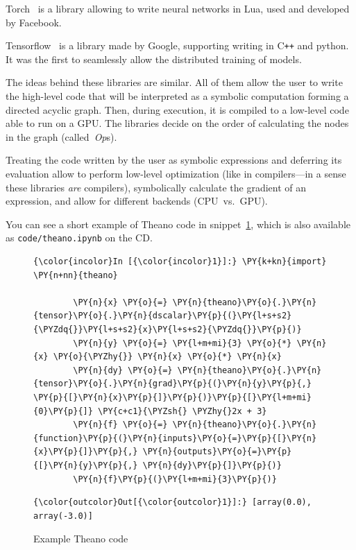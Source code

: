 Torch~\cite{torch} is a library allowing to write neural networks in Lua, used and developed by Facebook.

Tensorflow~\cite{tensorflow} is a library made by Google, supporting writing in C\texttt{++} and python. It was the first to seamlessly allow the distributed training of models.

The ideas behind these libraries are similar. All of them allow the user to write the high-level code that will be interpreted as a symbolic computation forming a directed acyclic graph. Then, during execution, it is compiled to a low-level code able to run on a GPU. The libraries decide on the order of calculating the nodes in the graph (called~\emph{Op}s).

Treating the code written by the user as symbolic expressions and deferring its evaluation allow to perform low-level optimization (like in compilers---in a sense these libraries \textit{are} compilers), symbolically calculate the gradient of an expression, and allow for different backends (CPU~vs.~GPU).

\renewcommand{\figurename}{Snippet}
You can see a short example of Theano code in snippet~\ref{theano-code}, which is also available as \texttt{code/theano.ipynb} on the CD.

\begin{figure}[!h]
\begin{Verbatim}[commandchars=\\\{\}]
{\color{incolor}In [{\color{incolor}1}]:} \PY{k+kn}{import} \PY{n+nn}{theano}
        
        \PY{n}{x} \PY{o}{=} \PY{n}{theano}\PY{o}{.}\PY{n}{tensor}\PY{o}{.}\PY{n}{dscalar}\PY{p}{(}\PY{l+s+s2}{\PYZdq{}}\PY{l+s+s2}{x}\PY{l+s+s2}{\PYZdq{}}\PY{p}{)}
        \PY{n}{y} \PY{o}{=} \PY{l+m+mi}{3} \PY{o}{*} \PY{n}{x} \PY{o}{\PYZhy{}} \PY{n}{x} \PY{o}{*} \PY{n}{x}
        \PY{n}{dy} \PY{o}{=} \PY{n}{theano}\PY{o}{.}\PY{n}{tensor}\PY{o}{.}\PY{n}{grad}\PY{p}{(}\PY{n}{y}\PY{p}{,} \PY{p}{[}\PY{n}{x}\PY{p}{]}\PY{p}{)}\PY{p}{[}\PY{l+m+mi}{0}\PY{p}{]} \PY{c+c1}{\PYZsh{} \PYZhy{}2x + 3}
        \PY{n}{f} \PY{o}{=} \PY{n}{theano}\PY{o}{.}\PY{n}{function}\PY{p}{(}\PY{n}{inputs}\PY{o}{=}\PY{p}{[}\PY{n}{x}\PY{p}{]}\PY{p}{,} \PY{n}{outputs}\PY{o}{=}\PY{p}{[}\PY{n}{y}\PY{p}{,} \PY{n}{dy}\PY{p}{]}\PY{p}{)}
        \PY{n}{f}\PY{p}{(}\PY{l+m+mi}{3}\PY{p}{)}
\end{Verbatim}

            \begin{Verbatim}[commandchars=\\\{\}]
{\color{outcolor}Out[{\color{outcolor}1}]:} [array(0.0), array(-3.0)]
\end{Verbatim}
              \cprotect\caption{Example Theano code}
              \label{theano-code}
\end{figure}

